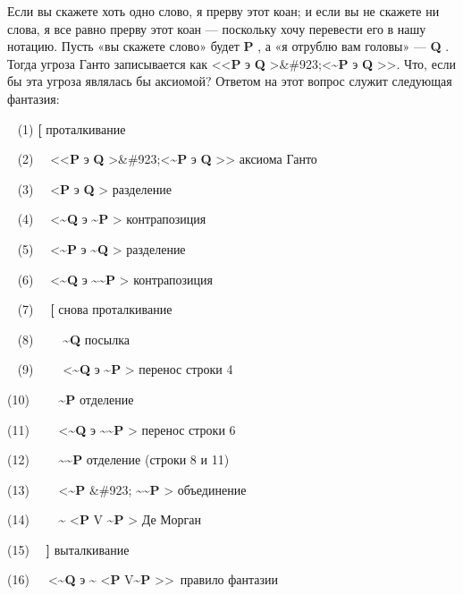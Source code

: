 Если вы скажете хоть одно слово, я прерву этот коан; и если вы не скажете ни слова, я все равно прерву этот коан --- поскольку хочу перевести его в нашу нотацию. Пусть «вы скажете слово» будет \textbf{P} , а «я отрублю вам головы» --- \textbf{Q} . Тогда угроза Ганто записывается как \textless\textless{}\textbf{P} э \textbf{Q} \textgreater\&\#923;\textless{}\textbf{\textasciitilde P} э \textbf{Q} \textgreater\textgreater. Что, если бы эта угроза являлась бы аксиомой? Ответом на этот вопрос служит следующая фантазия:

~ (1) \textbf{{[}} проталкивание

~ (2)~~ \textless\textless{}\textbf{P} э \textbf{Q} \textgreater\&\#923;\textless{}\textbf{\textasciitilde P} э \textbf{Q} \textgreater\textgreater{} аксиома Ганто

~ (3)~~ \textless{}\textbf{P} э \textbf{Q} \textgreater{} разделение

~ (4)~~ \textless{}\textbf{\textasciitilde Q} э \textbf{\textasciitilde P} \textgreater{} контрапозиция

~ (5)~~ \textless{}\textbf{\textasciitilde P} э \textbf{\textasciitilde Q} \textgreater{} разделение

~ (6)~~ \textless{}\textbf{\textasciitilde Q} э \textbf{\textasciitilde\textasciitilde P} \textgreater{} контрапозиция

~ (7)~~ \textbf{{[}} снова проталкивание

~ (8)~~~~ \textbf{\textasciitilde Q} посылка

~ (9)~~~~ \textless{}\textbf{\textasciitilde Q} э \textbf{\textasciitilde P} \textgreater{} перенос строки 4

(10)~~~ ~\textbf{\textasciitilde P} отделение

(11)~~~~ \textless{}\textbf{\textasciitilde Q} э \textbf{\textasciitilde\textasciitilde P} \textgreater{} перенос строки 6

(12)~~~~ \textbf{\textasciitilde\textasciitilde P} отделение (строки 8 и 11)

(13)~~~~ \textless{}\textbf{\textasciitilde P} \&\#923; \textbf{\textasciitilde\textasciitilde P} \textgreater{} объединение

(14)~~~~ \textbf{\textasciitilde{}} \textless{}\textbf{P} V \textbf{\textasciitilde P} \textgreater{} Де Морган

(15)~~ \textbf{{]}} выталкивание

(16)~~~\textless{}\textbf{\textasciitilde Q} э \textbf{\textasciitilde{}} \textless{}\textbf{P} V\textbf{\textasciitilde P} \textgreater\textgreater~правило фантазии

